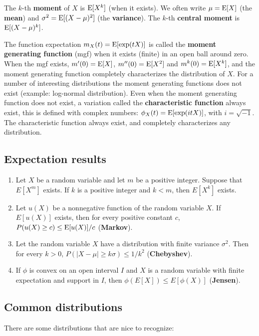 \documentclass[10pt]{article}
\begin{document}
The $k$-th \textbf{moment} of $X$ is $\operatorname{E} [X^k]$ (when it exists).  We often write $\mu=\operatorname{E}[X]$ (the \textbf{mean}) and
$\sigma^2 = \operatorname{E}[(X-\mu)^2]$ (the \textbf{variance}). The $k$-th \textbf{central moment} 
is $\operatorname{E} [ (X-\mu)^k]$.

The function expectation $m_X(t)=\operatorname{E}[\exp(tX)]$ is called the \textbf{moment
generating function} (mgf) when it exists (finite) in an open ball around zero. When the mgf exists,
$m'(0)=\operatorname{E}[X]$, $m''(0)=\operatorname{E}[X^2]$ and $m^k(0)=\operatorname{E}[X^k]$, and the moment generating function completely
characterizes the distribution of $X$. For a number of interesting distributions the moment generating
functions does not exist (example: log-normal distribution). Even when the moment generating function
does not exist, a variation called the \textbf{characteristic function} always exist, 
this is defined with complex numbers: $\phi_X(t)= \operatorname{E}[\exp(i t X)]$, with  $i = \sqrt{-1}$. 
The characteristic function always exist, and completely characterizes any distribution. 

\subsection{Expectation results}
\begin{enumerate}
\item Let $X$ be a random variable and let $m$ be a positive integer. 
Suppose that $E[X^m]$ exists. If $k$ is a positive integer and $k < m$, then
$E[X^k]$ exists.
\item Let $u(X)$ be a nonnegative function of the random variable $X$. If
$E[u(X)]$ exists, then for every positive constant $c$,
$P(u(X)\geq c) \leq \operatorname{E}[u(X)]/c$ (\textbf{Markov}).
\item Let the random variable $X$ have a distribution with
finite variance $\sigma^2$. Then for every $k>0$, 
$P(|X-\mu|\geq k\sigma) \leq 1/k^2$ (\textbf{Chebyshev}).
\item If $\phi$ is convex on an open interval $I$ and $X$ is a random variable
with finite expectation and support in $I$,
then $ \phi(E[X]) \leq E[\phi(X)]$ (\textbf{Jensen}).
\end{enumerate}

\subsection{Common distributions}
There are some distributions that are nice to recognize:
\end{document}
